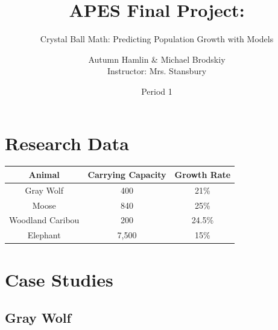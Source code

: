 \documentclass[12pt]{article}
\title{APES Final Project:}
\subtitle{Crystal Ball Math: Predicting Population Growth with Models}
\date{Period 1}
\author{Autumn Hamlin \& Michael Brodskiy\\ \small Instructor: Mrs. Stansbury}
\begin{document}
\maketitle

\newpage

\tableofcontents

\newpage

\section{Research Data}

\begin{center}
  \begin{tabular}{| c | c | c |}
    \hline
    \rowcolor{BurntOrange} Animal & Carrying Capacity & Growth Rate\\
    \hline
    \rowcolor{Gray!35} Gray Wolf & 400 & 21\%\\
    \hline
    Moose & 840 & 25\%\\
    \hline
    \rowcolor{Gray!35} Woodland Caribou & 200 & 24.5\%\\
    \hline
    Elephant & 7,500 & 15\%\\
    \hline
  \end{tabular}
\end{center}

\section{Case Studies}

\subsection{Gray Wolf}
\end{document}
